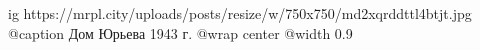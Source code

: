  
 
 
 
 

\ifcmt
  ig https://mrpl.city/uploads/posts/resize/w/750x750/md2xqrddttl4btjt.jpg
	@caption Дом Юрьева 1943 г.
  @wrap center
  @width 0.9
\fi
